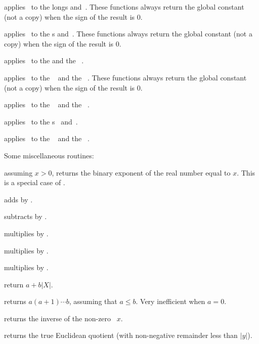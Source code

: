  applies \op\ to the longs
 and~. These functions always return the global constant
 (not a copy) when the sign of the result is $0$.

 applies \op\ to the
s  and~. These functions always return the global
constant  (not a copy) when the sign of the result is $0$.

 applies \op\ to the
  and the ~.

 applies \op\ to the
~ and the ~. These functions always return
the global constant  (not a copy) when the sign of the result
is $0$.

 applies \op\ to the
~ and the ~.

 applies \op\ to the
s~ and~.

 applies \op\ to the
~ and the ~.

\noindent Some miscellaneous routines:

 assuming $x > 0$, returns the binary exponent of
the real number equal to $x$. This is a special case of .

 adds  by .

 subtracts  by .

 multiplies  by .

 multiplies  by .

 multiplies  by .

 return $a + b|X|$.

 returns $a(a+1)\cdots b$, assuming
that $a \leq b$. Very inefficient when $a = 0$.

 returns the inverse of the non-zero ~$x$.

 returns the true Euclidean quotient
(with non-negative remainder less than $|y|$).

